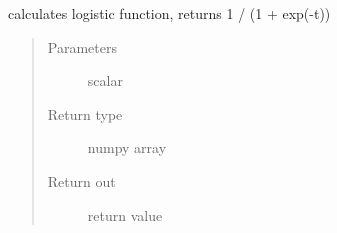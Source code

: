 \documentclass[letterpaper,10pt,english]{sphinxmanual}
\begin{document}

\begin{fulllineitems}
\label{\detokenize{regression:regression.phi}}
calculates logistic function, returns 1 / (1 + exp(-t))
\begin{quote}\begin{description}
\item[{Parameters}] \leavevmode
{} \textendash{} scalar

\item[{Return type}] \leavevmode
numpy array

\item[{Return out}] \leavevmode
return value

\end{description}\end{quote}

\end{fulllineitems}

\end{document}
